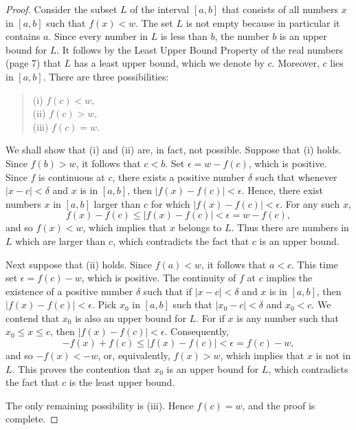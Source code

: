\begin{proof}
Consider the subset $L$ of the interval $[a, b]$ that consists of all numbers $x$ in $[a, b]$ such that $f(x) < w$. The set $L$ is not empty because in particular it contains  $a$. Since every
number in $L$ is less than $b$, the number $b$ is an upper bound for $L$. It follows by the Least Upper Bound Property of the real numbers (page 7) that $L$ has a least upper bound, which we denote by $c$. Moreover, $c$ lies in $[a, b]$. There are three possibilities:
\begin{quote}
\begin{description}
\item[(i) $f (c) < w,$]
\item[(ii) $f (c) > w,$]
\item[(iii) $f (c)= w.$]
\end{description}
\end{quote} 

We shall show that (i) and (ii) are, in fact, not possible. Suppose that
(i) holds. Since $f(b) > w$, it follows that $c < b$. Set $\epsilon = w - f(c)$, which is positive. Since $f$ is continuous at $c$, there exists a positive number $\delta$ such that whenever $|x - c|< \delta$ and $x$ is in $[a, b]$, then $|f(x) - f(c)| < \epsilon$. Hence,
there exist numbers $x$ in $[a, b]$ larger than $c$ for which $|f(x) - f(c)| < \epsilon$. For any such $x$, 
$$
f(x) - f(c) \leq |f(x) - f(c)| < \epsilon = w - f(c),
$$
and so $f(x) < w$, which implies that $x$ belongs to $L$. Thus there are numbers in $L$ which are larger than $c$, which contradicts the fact that $c$ is an upper bound.

Next suppose that (ii) holds. Since $f(a) < w$, it follows that $a < c$. This time set $\epsilon = f(c) - w$, which is positive. The continuity of $f$ at $c$ implies the existence of a positive number $\delta$ such that
if $| x-c | < \delta$ and $x$ is in $[a, b]$, then $|f(x) - f(c)| < \epsilon$. Pick $x_0$ in $[a, b]$ such that $|x_{0} - c | < \delta$ and $x_{0} < c$. We contend that $x_0$ is also an upper bound for $L$. For if $x$ is any
number such that $x_{0} \leq x \leq c$, then $|f(x) - f(c)| < \epsilon$. Consequently,
$$
- f(x) + f(c) \leq |f(x) - f(c)|< \epsilon = f(c) - w,
$$
and so $-f(x) < -w$, or, equivalently, $f(x) > w$, which implies that $x$ is not in $L$. This proves the contention that $x_0$ is an upper bound for $L$, which contradicts the fact that $c$ is the least
upper bound.

The only remaining possibility is (iii). Hence $f(c) = w$, and the proof is complete.
\end{proof}

